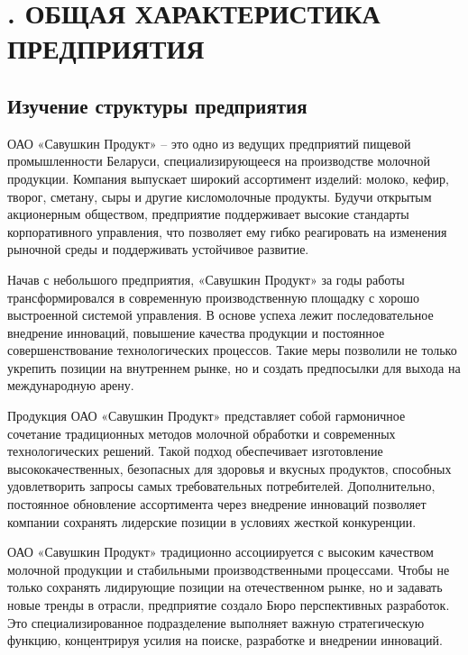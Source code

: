 \sectionbreak \section*{
  \gostTitleFont
  . ОБЩАЯ ХАРАКТЕРИСТИКА ПРЕДПРИЯТИЯ
}

\titlespace

\subsection*{ 
  \gostTitleFont
   Изучение структуры предприятия
} 

\subtitlespace

{\gostFont

  \par \redline ОАО «Савушкин Продукт» – это одно из ведущих предприятий пищевой промышленности Беларуси, специализирующееся на производстве молочной продукции. Компания выпускает широкий ассортимент изделий: молоко, кефир, творог, сметану, сыры и другие кисломолочные продукты. Будучи открытым акционерным обществом, предприятие поддерживает высокие стандарты корпоративного управления, что позволяет ему гибко реагировать на изменения рыночной среды и поддерживать устойчивое развитие. 

  \par \redline Начав с небольшого предприятия, «Савушкин Продукт» за годы работы трансформировался в современную производственную площадку с хорошо выстроенной системой управления. В основе успеха лежит последовательное внедрение инноваций, повышение качества продукции и постоянное совершенствование технологических процессов. Такие меры позволили не только укрепить позиции на внутреннем рынке, но и создать предпосылки для выхода на международную арену.

  \par \redline Продукция ОАО «Савушкин Продукт» представляет собой гармоничное сочетание традиционных методов молочной обработки и современных технологических решений. Такой подход обеспечивает изготовление высококачественных, безопасных для здоровья и вкусных продуктов, способных удовлетворить запросы самых требовательных потребителей. Дополнительно, постоянное обновление ассортимента через внедрение инноваций позволяет компании сохранять лидерские позиции в условиях жесткой конкуренции. 

  \par \redline ОАО «Савушкин Продукт» традиционно ассоциируется с высоким качеством молочной продукции и стабильными производственными процессами. Чтобы не только сохранять лидирующие позиции на отечественном рынке, но и задавать новые тренды в отрасли, предприятие создало Бюро перспективных разработок. Это специализированное подразделение выполняет важную стратегическую функцию, концентрируя усилия на поиске, разработке и внедрении инноваций. 

}
